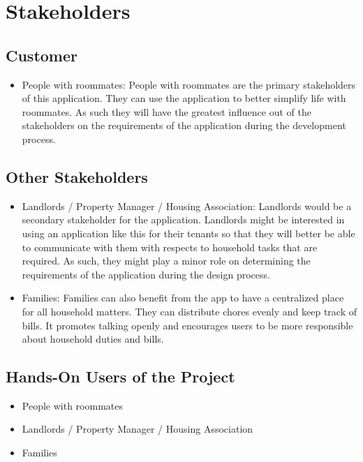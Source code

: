 \documentclass[12pt]{article}
\begin{document}
\section{Stakeholders}


\subsection{Customer}

\begin{itemize}
    \item People with roommates: People with roommates are the primary stakeholders of this application. They can use the application to better simplify life with roommates. As such they will have the greatest influence out of the stakeholders on the requirements of the application during the development process.
\end{itemize}

\subsection{Other Stakeholders}

\begin{itemize}
  \item Landlords / Property Manager / Housing Association: Landlords would be a secondary stakeholder for the application. Landlords might be interested in using an application like this for their tenants so that they will better be able to communicate with them with respects to household tasks that are required. As such, they might play a minor role on determining the requirements of the application during the design process.
  \item Families: Families can also benefit from the app to have a centralized place for all household matters. They can distribute chores evenly and keep track of bills. It promotes talking openly and encourages users to be more responsible about household duties and bills.
\end{itemize}

\subsection{Hands-On Users of the Project}

\begin{itemize}
    \item People with roommates
    \item Landlords / Property Manager / Housing Association
    \item Families
\end{itemize}
\end{document}
